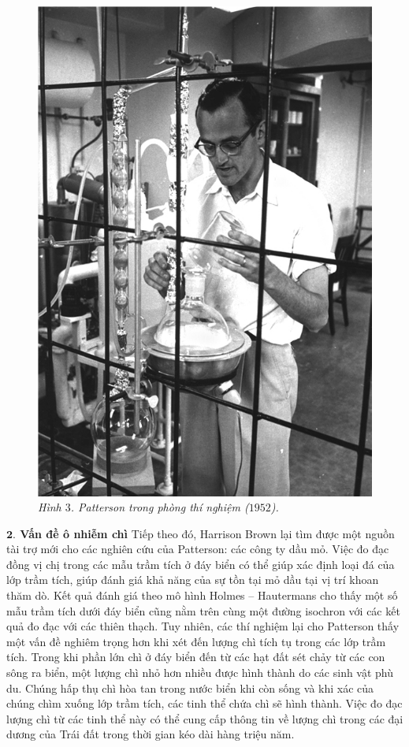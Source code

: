 \begin{multicols}{2}
\begin{figure}[H]
		\includegraphics[width= 1\linewidth]{3}
		\caption{\small\textit{\color{timhieukhoahoc}Hình $3$. Patterson trong phòng thí nghiệm ($1952$).}}
		\vspace*{-10pt}
	\end{figure}
	\textbf{\color{timhieukhoahoc}$\pmb{2.}$ Vấn đề ô nhiễm chì}
	\vskip 0.1cm
	Tiếp theo đó, Harrison Brown lại tìm được một nguồn tài trợ mới cho các nghiên cứu của Patterson: các công ty dầu mỏ. Việc đo đạc đồng vị chị trong các mẫu trầm tích ở đáy biển có thể giúp xác định loại đá của lớp trầm tích, giúp đánh giá khả năng của sự tồn tại mỏ dầu tại vị trí khoan thăm dò. Kết quả đánh giá theo mô hình Holmes -- Hautermans cho thấy một số mẫu trầm tích dưới đáy biển cũng nằm trên cùng một đường isochron với các kết quả đo đạc với các thiên thạch.
	\vskip 0.1cm
	Tuy nhiên, các thí nghiệm lại cho Patterson thấy một vấn đề nghiêm trọng hơn khi xét đến lượng chì tích tụ trong các lớp trầm tích. Trong khi phần lớn chì ở đáy biển đến từ các hạt đất sét chảy từ các con sông ra biển, một lượng chì nhỏ hơn nhiều được hình thành do các sinh vật phù du. Chúng hấp thụ chì hòa tan trong nước biển khi còn sống và khi xác của chúng chìm xuống lớp trầm tích, các tinh thể chứa chì sẽ hình thành. Việc đo đạc lượng chì từ các tinh thể này có thể cung cấp thông tin về lượng chì trong các đại dương của Trái đất trong thời gian kéo dài hàng triệu năm.

\end{multicols}
